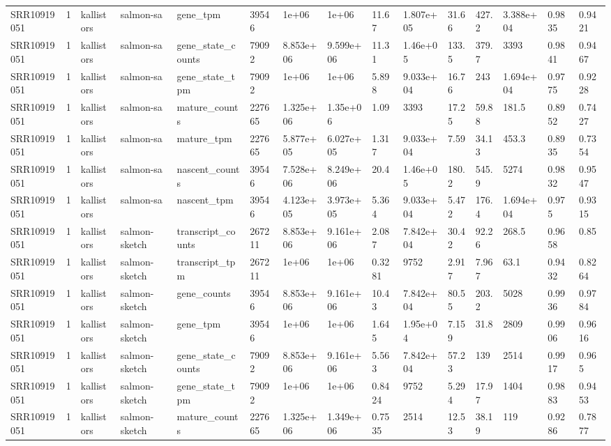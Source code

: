 \begin{tabular}{lllllllllllllll}
SRR10919051 & 1 & kallistors & salmon-sa & gene\_tpm & 39546 & 1e+06 & 1e+06 & 11.67 & 1.807e+05 & 31.66 & 427.2 & 3.388e+04 & 0.9835 & 0.9421 \\
SRR10919051 & 1 & kallistors & salmon-sa & gene\_state\_counts & 79092 & 8.853e+06 & 9.599e+06 & 11.31 & 1.46e+05 & 133.5 & 379.7 & 3393 & 0.9841 & 0.9467 \\
SRR10919051 & 1 & kallistors & salmon-sa & gene\_state\_tpm & 79092 & 1e+06 & 1e+06 & 5.898 & 9.033e+04 & 16.76 & 243 & 1.694e+04 & 0.9775 & 0.9228 \\
SRR10919051 & 1 & kallistors & salmon-sa & mature\_counts & 227665 & 1.325e+06 & 1.35e+06 & 1.09 & 3393 & 17.25 & 59.88 & 181.5 & 0.8952 & 0.7427 \\
SRR10919051 & 1 & kallistors & salmon-sa & mature\_tpm & 227665 & 5.877e+05 & 6.027e+05 & 1.317 & 9.033e+04 & 7.59 & 34.13 & 453.3 & 0.8935 & 0.7354 \\
SRR10919051 & 1 & kallistors & salmon-sa & nascent\_counts & 39546 & 7.528e+06 & 8.249e+06 & 20.4 & 1.46e+05 & 180.2 & 545.9 & 5274 & 0.9832 & 0.9547 \\
SRR10919051 & 1 & kallistors & salmon-sa & nascent\_tpm & 39546 & 4.123e+05 & 3.973e+05 & 5.364 & 9.033e+04 & 5.472 & 176.4 & 1.694e+04 & 0.975 & 0.9315 \\
SRR10919051 & 1 & kallistors & salmon-sketch & transcript\_counts & 267211 & 8.853e+06 & 9.161e+06 & 2.087 & 7.842e+04 & 30.42 & 92.26 & 268.5 & 0.9658 & 0.85 \\
SRR10919051 & 1 & kallistors & salmon-sketch & transcript\_tpm & 267211 & 1e+06 & 1e+06 & 0.3281 & 9752 & 2.917 & 7.967 & 63.1 & 0.9432 & 0.8264 \\
SRR10919051 & 1 & kallistors & salmon-sketch & gene\_counts & 39546 & 8.853e+06 & 9.161e+06 & 10.43 & 7.842e+04 & 80.55 & 203.2 & 5028 & 0.9936 & 0.9784 \\
SRR10919051 & 1 & kallistors & salmon-sketch & gene\_tpm & 39546 & 1e+06 & 1e+06 & 1.645 & 1.95e+04 & 7.159 & 31.8 & 2809 & 0.9906 & 0.9616 \\
SRR10919051 & 1 & kallistors & salmon-sketch & gene\_state\_counts & 79092 & 8.853e+06 & 9.161e+06 & 5.563 & 7.842e+04 & 57.23 & 139 & 2514 & 0.9917 & 0.965 \\
SRR10919051 & 1 & kallistors & salmon-sketch & gene\_state\_tpm & 79092 & 1e+06 & 1e+06 & 0.8424 & 9752 & 5.294 & 17.97 & 1404 & 0.9883 & 0.9453 \\
SRR10919051 & 1 & kallistors & salmon-sketch & mature\_counts & 227665 & 1.325e+06 & 1.349e+06 & 0.7535 & 2514 & 12.53 & 38.19 & 119 & 0.9286 & 0.7877 \\

\end{tabular}
